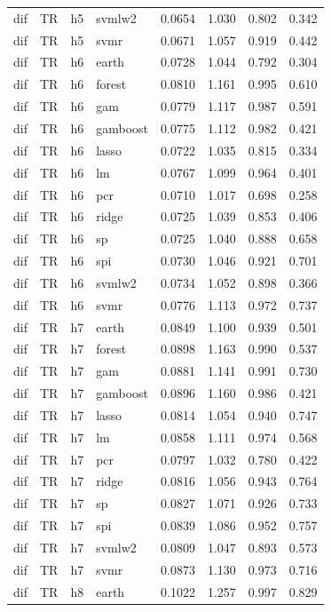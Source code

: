 \begin{ThreePartTable}
\begin{longtable}[t]{llclcccc}
dif & TR & h5 & svmlw2 & 0.0654 & 1.030 & 0.802 & 0.342\\
dif & TR & h5 & svmr & 0.0671 & 1.057 & 0.919 & 0.442\\
\addlinespace
dif & TR & h6 & earth & 0.0728 & 1.044 & 0.792 & 0.304\\
dif & TR & h6 & forest & 0.0810 & 1.161 & 0.995 & 0.610\\
dif & TR & h6 & gam & 0.0779 & 1.117 & 0.987 & 0.591\\
dif & TR & h6 & gamboost & 0.0775 & 1.112 & 0.982 & 0.421\\
dif & TR & h6 & lasso & 0.0722 & 1.035 & 0.815 & 0.334\\
dif & TR & h6 & lm & 0.0767 & 1.099 & 0.964 & 0.401\\
dif & TR & h6 & pcr & 0.0710 & 1.017 & 0.698 & 0.258\\
dif & TR & h6 & ridge & 0.0725 & 1.039 & 0.853 & 0.406\\
dif & TR & h6 & sp & 0.0725 & 1.040 & 0.888 & 0.658\\
dif & TR & h6 & spi & 0.0730 & 1.046 & 0.921 & 0.701\\
dif & TR & h6 & svmlw2 & 0.0734 & 1.052 & 0.898 & 0.366\\
dif & TR & h6 & svmr & 0.0776 & 1.113 & 0.972 & 0.737\\
\addlinespace
dif & TR & h7 & earth & 0.0849 & 1.100 & 0.939 & 0.501\\
dif & TR & h7 & forest & 0.0898 & 1.163 & 0.990 & 0.537\\
dif & TR & h7 & gam & 0.0881 & 1.141 & 0.991 & 0.730\\
dif & TR & h7 & gamboost & 0.0896 & 1.160 & 0.986 & 0.421\\
dif & TR & h7 & lasso & 0.0814 & 1.054 & 0.940 & 0.747\\
dif & TR & h7 & lm & 0.0858 & 1.111 & 0.974 & 0.568\\
dif & TR & h7 & pcr & 0.0797 & 1.032 & 0.780 & 0.422\\
dif & TR & h7 & ridge & 0.0816 & 1.056 & 0.943 & 0.764\\
dif & TR & h7 & sp & 0.0827 & 1.071 & 0.926 & 0.733\\
dif & TR & h7 & spi & 0.0839 & 1.086 & 0.952 & 0.757\\
dif & TR & h7 & svmlw2 & 0.0809 & 1.047 & 0.893 & 0.573\\
dif & TR & h7 & svmr & 0.0873 & 1.130 & 0.973 & 0.716\\
\addlinespace
dif & TR & h8 & earth & 0.1022 & 1.257 & 0.997 & 0.829\\

\end{longtable}
\end{ThreePartTable}
